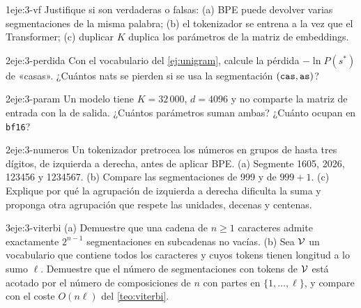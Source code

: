 \begin{ejercicio}{1}{eje:3-vf}
Justifique si son verdaderas o falsas: (a) BPE puede devolver varias segmentaciones de la misma palabra; (b) el tokenizador se entrena a la vez que el Transformer; (c) duplicar $K$ duplica los parámetros de la matriz de embeddings.
\end{ejercicio}

\begin{ejercicio}{2}{eje:3-perdida}
Con el vocabulario del \cref{ej:unigram}, calcule la pérdida $-\ln P(s^{*})$ de «casas». ¿Cuántos nats se pierden si se usa la segmentación $(\texttt{cas},\texttt{as})$?
\end{ejercicio}

\begin{ejercicio}{2}{eje:3-param}
Un modelo tiene $K=32\,000$, $d=4096$ y no comparte la matriz de entrada con la de salida. ¿Cuántos parámetros suman ambas? ¿Cuánto ocupan en \texttt{bf16}?
\end{ejercicio}

\begin{ejercicio}{2}{eje:3-numeros}
Un tokenizador pretrocea los números en grupos de hasta tres dígitos, de izquierda a derecha, antes de aplicar BPE. (a) Segmente 1605, 2026, 123456 y 1234567. (b) Compare las segmentaciones de 999 y de $999+1$. (c) Explique por qué la agrupación de izquierda a derecha dificulta la suma y proponga otra agrupación que respete las unidades, decenas y centenas.
\end{ejercicio}

\begin{ejercicio}{3}{eje:3-viterbi}
(a) Demuestre que una cadena de $n\ge 1$ caracteres admite exactamente $2^{n-1}$ segmentaciones en subcadenas no vacías. (b) Sea $\mathcal{V}$ un vocabulario que contiene todos los caracteres y cuyos tokens tienen longitud a lo sumo $\ell$. Demuestre que el número de segmentaciones con tokens de $\mathcal{V}$ está acotado por el número de composiciones de $n$ con partes en $\{1,\dots,\ell\}$, y compare con el coste $O(n\ell)$ del \cref{teo:viterbi}.
\end{ejercicio}
